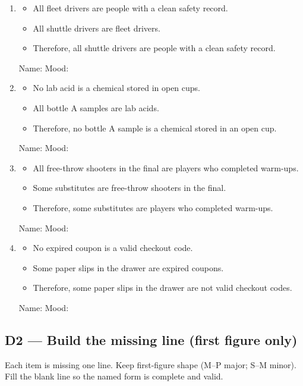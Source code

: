\documentclass[11pt]{article}
\newcommand{\syllblock}[3]{%
\begin{itemize}[leftmargin=1.2em]
\item #1
\item #2
\item #3
\end{itemize}
}
\begin{document}
\begin{enumerate}
\item
\syllblock
{All fleet drivers are people with a clean safety record.}
{All shuttle drivers are fleet drivers.}
{Therefore, all shuttle drivers are people with a clean safety record.}
Name: \underline{\hspace{1.4in}}
Mood: \underline{\hspace{0.9in}}

\item
\syllblock
{No lab acid is a chemical stored in open cups.}
{All bottle A samples are lab acids.}
{Therefore, no bottle A sample is a chemical stored in an open cup.}
Name: \underline{\hspace{1.4in}}
Mood: \underline{\hspace{0.9in}}

\item
\syllblock
{All free-throw shooters in the final are players who completed warm-ups.}
{Some substitutes are free-throw shooters in the final.}
{Therefore, some substitutes are players who completed warm-ups.}
Name: \underline{\hspace{1.4in}}
Mood: \underline{\hspace{0.9in}}

\item
\syllblock
{No expired coupon is a valid checkout code.}
{Some paper slips in the drawer are expired coupons.}
{Therefore, some paper slips in the drawer are not valid checkout codes.}
Name: \underline{\hspace{1.4in}}
Mood: \underline{\hspace{0.9in}}
\end{enumerate}

\subsection*{D2 --- Build the missing line (first figure only)}
\noindent Each item is missing one line. Keep first-figure shape (M--P major; S--M minor). Fill the blank line so the named form is complete and valid.
\end{document}
